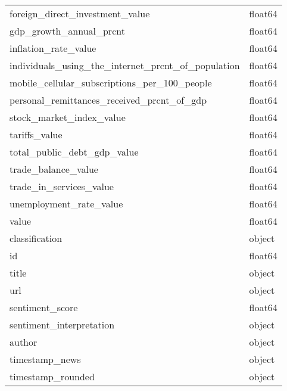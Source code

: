 \begin{tabular}{ll}
foreign_direct_investment_value & float64 \\
gdp_growth_annual_prcnt & float64 \\
inflation_rate_value & float64 \\
individuals_using_the_internet_prcnt_of_population & float64 \\
mobile_cellular_subscriptions_per_100_people & float64 \\
personal_remittances_received_prcnt_of_gdp & float64 \\
stock_market_index_value & float64 \\
tariffs_value & float64 \\
total_public_debt_gdp_value & float64 \\
trade_balance_value & float64 \\
trade_in_services_value & float64 \\
unemployment_rate_value & float64 \\
value & float64 \\
classification & object \\
id & float64 \\
title & object \\
url & object \\
sentiment_score & float64 \\
sentiment_interpretation & object \\
author & object \\
timestamp_news & object \\
timestamp_rounded & object \\
\bottomrule
\end{tabular}


